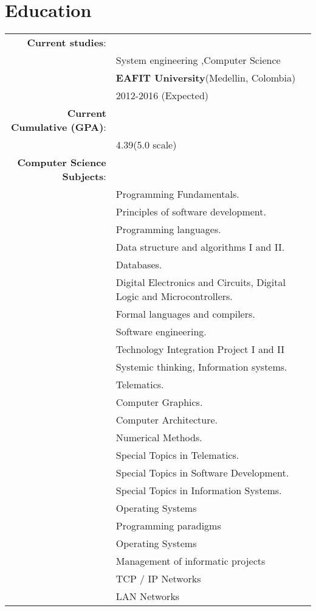 \documentclass[a4paper,10pt]{article} %
\begin{document}
\section{Education}
\begin{tabular}{rl}
\textbf{Current studies}:\\
&\textsc{}System engineering ,Computer Science\\
&\textbf{EAFIT University}(Medellin, Colombia)\\
& 2012-2016 (Expected)\\
\textbf{Current Cumulative (GPA)}:\\
&\textsc{}4.39(5.0 scale)\\
\textbf{Computer Science Subjects}:\\
&\textbf{}Programming Fundamentals.\\
&\textbf{}Principles of software development.\\
&\textbf{}Programming languages.\\
&\textbf{}Data structure and algorithms I and II.\\
&\textbf{}Databases.\\
&\textbf{}Digital Electronics and Circuits, Digital Logic and Microcontrollers.\\
&\textbf{}Formal languages and compilers.\\
&\textbf{}Software engineering.\\
&\textbf{}Technology Integration Project I and II\\
&\textbf{}Systemic thinking, Information systems.\\
&\textbf{}Telematics.\\
&\textbf{}Computer Graphics.\\
&\textbf{}Computer Architecture.\\
&\textbf{}Numerical Methods.\\
&\textbf{}Special Topics in Telematics.\\
&\textbf{}Special Topics in Software Development.\\
&\textbf{}Special Topics in Information Systems.\\
&\textbf{}Operating Systems\\
&\textbf{}Programming paradigms\\
&\textbf{}Operating Systems\\
&\textbf{}Management of informatic projects\\
&\textbf{}TCP / IP Networks\\
&\textbf{}LAN Networks\\

\end{tabular}
\end{document}

